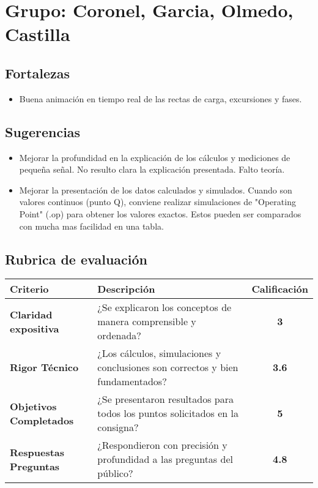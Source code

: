 \documentclass[]{informeutn}
\begin{document}
  \maketitle

    \chapter{Grupo: Coronel, Garcia, Olmedo, Castilla}
      \section{Fortalezas}
        \begin{itemize}
            \item Buena animación en tiempo real de las rectas de carga, excursiones y fases.
        \end{itemize}
      \section{Sugerencias}
        \begin{itemize}
            \item Mejorar la profundidad en la explicación de los cálculos y mediciones de pequeña señal. No resulto
              clara la explicación presentada. Falto teoría.
            \item Mejorar la presentación de los datos calculados y simulados. Cuando son valores continuos (punto Q),
              conviene realizar simulaciones de "Operating Point" (.op) para obtener los valores exactos. Estos pueden
              ser comparados con mucha mas facilidad en una tabla.
        \end{itemize}
      \section{Rubrica de evaluación}
        \begin{table}[!ht]
          \centering
          \begin{tabular}{|p{4.5cm}|p{7.5cm}|c|}
            \hline
            \textbf{Criterio} & \textbf{Descripción} & \textbf{Calificación} \\ \hline
            \textbf{Claridad expositiva} & ¿Se explicaron los conceptos de manera comprensible y ordenada? & \textbf{3} \\ \hline
            \textbf{Rigor Técnico} & ¿Los cálculos, simulaciones y conclusiones son correctos y bien fundamentados? & \textbf{3.6} \\ \hline
            \textbf{Objetivos Completados} & ¿Se presentaron resultados para todos los puntos solicitados en la consigna? & \textbf{5} \\ \hline
            \textbf{Respuestas Preguntas} & ¿Respondieron con precisión y profundidad a las preguntas del público? & \textbf{4.8} \\ \hline
          \end{tabular}
        \end{table}
\end{document}

